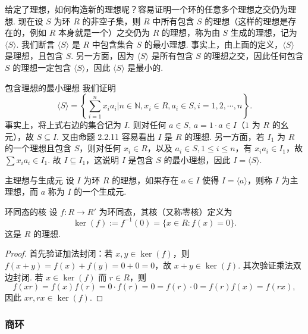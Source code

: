 \documentclass[12pt, a4paper]{ctexart}
\begin{document}
给定了理想，如何构造新的理想呢？容易证明一个环的任意多个理想之交仍为理想. 现在设 $S$ 为环 $R$ 的非空子集，则 $R$ 中所有包含 $S$ 的理想（这样的理想是存在的，例如 $R$ 本身就是一个）之交仍为 $R$ 的理想，称为由 $S$ 生成的理想，记为 $\langle S \rangle$. 我们断言 $\langle S \rangle$ 是 $R$ 中包含集合 $S$ 的最小理想. 事实上，由上面的定义，$\langle S \rangle$ 是理想，且包含 $S$. 另一方面，因为 $\langle S \rangle$ 是所有包含 $S$ 的理想之交，因此任何包含 $S$ 的理想一定包含 $\langle S \rangle$，因此 $\langle S \rangle$ 是最小的. 
\begin{example}{包含理想的最小理想}{}
	我们证明
	\[
	\langle S \rangle = \left\{ \sum_{i=1}^n x_i a_i \bigg| n \in \mathbb{N}, x_i \in R, a_i \in S, i = 1, 2, \cdots, n \right\}.
	\]
	事实上，将上式右边的集合记为 $I$. 则对任何 $a \in S, \, a = 1 \cdot a \in I$（$1$ 为 $R$ 的幺元），故 $S \subseteq I$. 又由命题 2.2.11 容易看出 $I$ 是 $R$ 的理想. 另一方面，若 $I_1$ 为 $R$ 的一个理想且包含 $S$，则对任何 $x_i \in R$，以及 $a_i \in S, 1 \leqslant i \leqslant n$，有 $x_i a_i \in I_1$，故 $\sum x_i a_i \in I_1$. 故 $I \subseteq I_1$，这说明 $I$ 是包含 $S$ 的最小理想，因此 $I = \langle S \rangle$. 
\end{example}
\begin{definition}{主理想与生成元}{}
	设 $I$ 为环 $R$ 的理想，如果存在 $a \in I$ 使得 $I = \langle a \rangle$，则称 $I$ 为主理想，而 $a$ 称为 $I$ 的一个生成元. 
\end{definition}
\begin{proposition}{环同态的核}{}
	设 $f: R \rightarrow R'$ 为环同态，其核（又称零核）定义为
	\[
	\ker(f) := f^{-1}(0) = \{ x \in R : f(x) = 0 \}.
	\]
	这是 $R$ 的理想. 
\end{proposition}
\begin{proof}
	首先验证加法封闭：若 $x, y \in \ker(f)$，则 $f(x + y) = f(x) + f(y) = 0 + 0 = 0$，故 $x + y \in \ker(f)$. 其次验证乘法双边封闭. 若 $x \in \ker(f)$ 而 $r \in R$，则
	\[
	f(xr) = f(x)f(r) = 0 \cdot f(r) = 0 = f(r) \cdot 0 = f(r)f(x) = f(rx),
	\]
	因此 $xr, rx \in \ker(f)$. 
\end{proof}
\subsubsection{商环}
\end{document}
